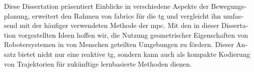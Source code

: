 \begin{otherlanguage}{german}
Diese Dissertation präsentiert Einblicke in verschiedene Aspekte der
Bewegungsplanung, erweitert den Rahmen von \ac{fabrics} für die \ac{tg} und
vergleicht ihn umfassend mit der häufiger verwendeten Methode der \ac{mpc}. Mit
den in dieser Dissertation vorgestellten Ideen hoffen wir, die Nutzung
geometrischer Eigenschaften von Robotersystemen in von Menschen geteilten
Umgebungen zu fördern. Dieser Ansatz bietet nicht nur eine reaktive \ac{tg},
sondern kann auch als kompakte Kodierung von Trajektorien für zukünftige
lernbasierte Methoden dienen.
\end{otherlanguage}
